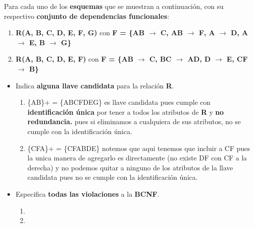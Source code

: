 Para cada uno de los \textbf{esquemas} que se muestran a continuación, con su respectivo \textbf{conjunto de dependencias funcionales}:

\begin{enumerate}[label=\alph*.]
    \item \textbf{R(A, B, C, D, E, F, G)} con \textbf{F = \{AB $\rightarrow$ C, AB $\rightarrow$ F, A $\rightarrow$ D, A $\rightarrow$ E, B $\rightarrow$ G\}}
    \item \textbf{R(A, B, C, D, E, F)} con \textbf{F = \{AB $\rightarrow$ C, BC $\rightarrow$ AD, D $\rightarrow$ E, CF $\rightarrow$ B\}}
\end{enumerate}

\begin{itemize}
    \item Indica \textbf{alguna llave candidata} para la relación \textbf{R}. \vspace{.3cm}

    \begin{enumerate}[label=\alph*.]
        \item \{AB\}+ = \{ABCFDEG\} es llave candidata pues cumple con \textbf{identificación única} por tener a todos los atributos de \textbf{R} y \textbf{no redundancia.} pues si eliminamos a cualquiera de sus atributos, no se cumple con la identificación única.  \vspace{.2cm}
        
        \item \{CFA\}+ = \{CFABDE\} notemos que aqui tenemos que incluir a CF pues la unica manera de agregarlo es directamente (no existe DF con CF a la derecha) y no podemos quitar a ninguno de los atributos de la llave candidata pues no se cumple con la identificación única. \vspace{.2cm}
    \end{enumerate}
    \vspace{.3cm}

    \item Especifica \textbf{todas las violaciones} a la \textbf{BCNF}. \vspace{.3cm}
    
    \begin{enumerate}[label=\alph*.]
        \item \vspace{.2cm}
        \item \vspace{.2cm}
    \end{enumerate}
    \vspace{.3cm}


\end{itemize}
